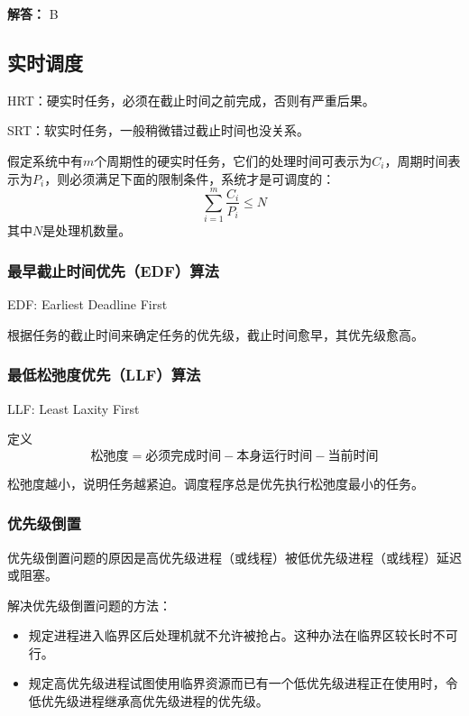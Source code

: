 \documentclass[12pt, a4paper, oneside]{ctexart}
\newenvironment{solution}{\begin{shaded}\par\noindent\textbf{解答：}}{\end{shaded}\par}
\begin{document}
\begin{solution}
B
\end{solution}

\subsection{实时调度}

HRT：硬实时任务，必须在截止时间之前完成，否则有严重后果。

SRT：软实时任务，一般稍微错过截止时间也没关系。

假定系统中有$m$个周期性的硬实时任务，它们的处理时间可表示为$C_i$，周期时间表示为$P_i$，则必须满足下面的限制条件，系统才是可调度的：
\begin{equation*}
    \sum_{i=1}^m \frac{C_i}{P_i}\leq N
\end{equation*}
其中$N$是处理机数量。

\subsubsection{最早截止时间优先（EDF）算法}

EDF: Earliest Deadline First

根据任务的截止时间来确定任务的优先级，截止时间愈早，其优先级愈高。

\subsubsection{最低松弛度优先（LLF）算法}

LLF: Least Laxity First

定义
\begin{equation*}
    \text{松弛度} = \text{必须完成时间} - \text{本身运行时间} - \text{当前时间}
\end{equation*}

松弛度越小，说明任务越紧迫。调度程序总是优先执行松弛度最小的任务。

\subsubsection{优先级倒置}

优先级倒置问题的原因是高优先级进程（或线程）被低优先级进程（或线程）延迟或阻塞。

解决优先级倒置问题的方法：
\begin{itemize}
    \item 规定进程进入临界区后处理机就不允许被抢占。这种办法在临界区较长时不可行。
    \item 规定高优先级进程试图使用临界资源而已有一个低优先级进程正在使用时，令低优先级进程继承高优先级进程的优先级。
\end{itemize}
\end{document}
